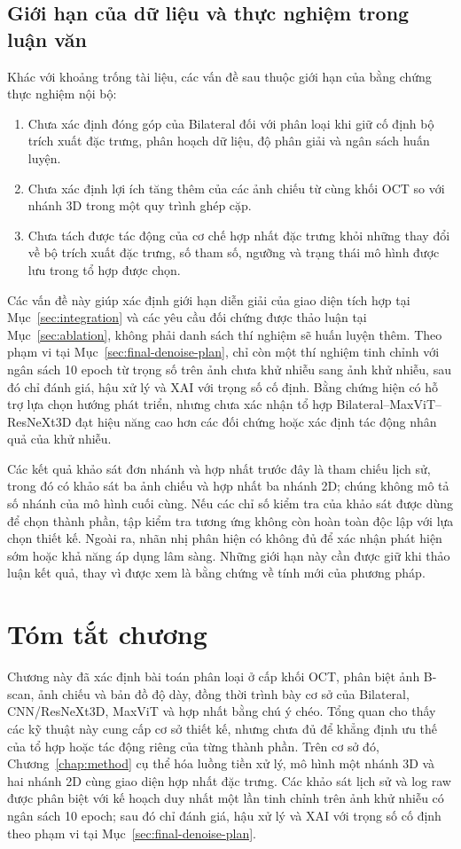 \documentclass[14pt,a4paper,oneside]{extreport}
\begin{document}
\subsection{Giới hạn của dữ liệu và thực nghiệm trong luận văn}
Khác với khoảng trống tài liệu, các vấn đề sau thuộc giới hạn của
bằng chứng thực nghiệm nội bộ:
\begin{enumerate}[label=\arabic*.,leftmargin=1cm]
 \item Chưa xác định đóng góp của Bilateral đối với phân loại khi giữ
 cố định bộ trích xuất đặc trưng, phân hoạch dữ liệu, độ phân giải và ngân sách huấn luyện.
 \item Chưa xác định lợi ích tăng thêm của các ảnh chiếu từ cùng khối
 OCT so với nhánh 3D trong một quy trình ghép cặp.
 \item Chưa tách được tác động của cơ chế hợp nhất đặc trưng khỏi những
 thay đổi về bộ trích xuất đặc trưng, số tham số, ngưỡng và trạng thái
 mô hình được lưu trong tổ hợp được chọn.
\end{enumerate}
Các vấn đề này giúp xác định giới hạn diễn giải của giao diện tích hợp
tại Mục~\ref{sec:integration} và các yêu cầu đối chứng được thảo luận tại
Mục~\ref{sec:ablation}, không phải danh sách thí nghiệm sẽ huấn luyện thêm.
Theo phạm vi tại Mục~\ref{sec:final-denoise-plan}, chỉ còn một thí nghiệm
tinh chỉnh với ngân sách 10 epoch từ trọng số trên ảnh chưa khử nhiễu
sang ảnh khử nhiễu, sau đó chỉ đánh giá, hậu xử lý và XAI với trọng số
cố định. Bằng chứng hiện có hỗ trợ lựa chọn hướng phát triển, nhưng
chưa xác nhận tổ hợp Bilateral--MaxViT--ResNeXt3D đạt hiệu năng cao hơn
các đối chứng hoặc xác định tác động nhân quả của khử nhiễu.

Các kết quả khảo sát đơn nhánh và hợp nhất trước đây là tham chiếu
lịch sử, trong đó có khảo sát ba ảnh chiếu và hợp nhất ba nhánh 2D;
chúng không mô tả số nhánh của mô hình cuối cùng. Nếu các chỉ số kiểm
tra của khảo sát được dùng để chọn thành phần, tập kiểm tra tương
ứng không còn hoàn toàn độc lập với lựa chọn thiết kế. Ngoài ra,
nhãn nhị phân hiện có không đủ để xác nhận phát hiện sớm hoặc khả
năng áp dụng lâm sàng. Những giới hạn này cần được giữ khi thảo luận
kết quả, thay vì được xem là bằng chứng về tính mới của phương pháp.

\section{Tóm tắt chương}
\label{sec:background-summary}
Chương này đã xác định bài toán phân loại ở cấp khối OCT, phân biệt
ảnh B-scan, ảnh chiếu và bản đồ độ dày, đồng thời trình bày cơ sở của
Bilateral, CNN/ResNeXt3D, MaxViT và hợp nhất bằng chú ý chéo. Tổng quan
cho thấy các kỹ thuật này cung cấp cơ sở thiết kế, nhưng chưa đủ để
khẳng định ưu thế của tổ hợp hoặc tác động riêng của từng thành phần.
Trên cơ sở đó, Chương~\ref{chap:method} cụ thể hóa luồng tiền xử lý,
mô hình một nhánh 3D và hai nhánh 2D cùng giao diện hợp nhất đặc trưng.
Các khảo sát lịch sử và log raw được phân biệt với kế hoạch duy nhất
một lần tinh chỉnh trên ảnh khử nhiễu có ngân sách 10 epoch; sau đó
chỉ đánh giá, hậu xử lý và XAI với trọng số cố định theo phạm vi tại
Mục~\ref{sec:final-denoise-plan}.
\end{document}
